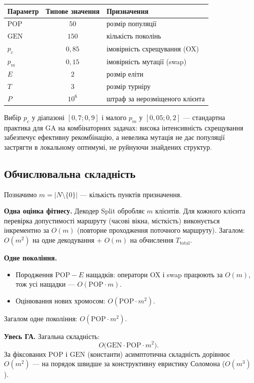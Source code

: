 \documentclass[14pt,a4paper]{extarticle}
\theoremstyle{definition}
\theoremstyle{plain}
\begin{document}
\begin{center}
\begin{tabular}{@{} l c p{7.5cm} @{}}
\toprule
\textbf{Параметр} & \textbf{Типове значення} & \textbf{Призначення} \\
\midrule
$\mathrm{POP}$ & $50$ & розмір популяції \\
$\mathrm{GEN}$ & $150$ & кількість поколінь \\
$p_c$ & $0{,}85$ & імовірність схрещування (OX) \\
$p_m$ & $0{,}15$ & імовірність мутації (swap) \\
$E$ & $2$ & розмір еліти \\
$T$ & $3$ & розмір турніру \\
$P$ & $10^{6}$ & штраф за нерозміщеного клієнта \\
\bottomrule
\end{tabular}
\end{center}

Вибір $p_c$ у діапазоні $[0{,}7; 0{,}9]$ і малого $p_m$ у $[0{,}05; 0{,}2]$ --- стандартна практика для GA на комбінаторних задачах: висока інтенсивність схрещування забезпечує ефективну рекомбінацію, а невелика мутація не дає популяції застрягти в локальному оптимумі, не руйнуючи знайдених структур.

\subsection{Обчислювальна складність}

Позначимо $m = |N \setminus \{0\}|$ --- кількість пунктів призначення.

\textbf{Одна оцінка фітнесу.} Декодер Split обробляє $m$ клієнтів. Для кожного клієнта перевірка допустимості маршруту (часові вікна, місткість) виконується інкрементно за $O(m)$ (повторне проходження поточного маршруту). Загалом: $O(m^2)$ на одне декодування + $O(m)$ на обчислення $T_{\mathrm{total}}$.

\textbf{Одне покоління.}
\begin{itemize}[leftmargin=2em]
    \item Породження $\mathrm{POP} - E$ нащадків: оператори OX і swap працюють за $O(m)$, тож усі нащадки --- $O(\mathrm{POP} \cdot m)$.
    \item Оцінювання нових хромосом: $O(\mathrm{POP} \cdot m^2)$.
\end{itemize}
Загалом одне покоління: $O(\mathrm{POP} \cdot m^2)$.

\textbf{Увесь ГА.} Загальна складність:
\[
    O\bigl(\mathrm{GEN} \cdot \mathrm{POP} \cdot m^2\bigr).
\]
За фіксованих $\mathrm{POP}$ і $\mathrm{GEN}$ (константи) асимптотична складність дорівнює $O(m^2)$ --- на порядок швидше за конструктивну евристику Соломона ($O(m^3)$).
\end{document}
